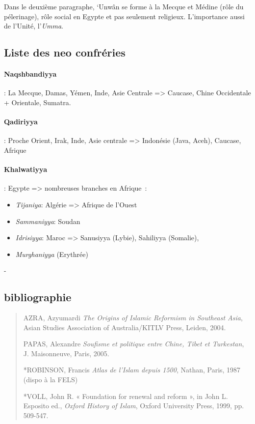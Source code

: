\begin{Prop}
 Dans le deuxième paragraphe, `Unwân se forme à la Mecque et Médine (rôle du pélerinage), rôle social en Egypte et pas seulement religieux. L'importance aussi de l'Unité, l'\textit{Umma}. 
\end{Prop}
 
\subsection{Liste des neo confréries}

\paragraph{Naqshbandiyya}: La Mecque, Damas, Yémen, Inde, Asie Centrale \label{Def:Naqshbandiyya}
                     => Caucase, Chine Occidentale + Orientale, Sumatra.

\paragraph{Qadiriyya}: Proche Orient, Irak, Inde, Asie centrale 
                    => Indonésie (Java, Aceh), Caucase, Afrique

\paragraph{Khalwatiyya}: Egypte => nombreuses branches en Afrique :

\begin{itemize}
    \item \textit{Tijaniya}: Algérie => Afrique de l’Ouest
    \item \textit{Sammaniyya}: Soudan
    \item \textit{Idrisiyya}: Maroc => Sanusiyya (Lybie), Sahiliyya (Somalie),
    \item \textit{Murghaniyya} (Erythrée)
\end{itemize}- 
 
\subsection{bibliographie}

\begin{quote}


AZRA, Azyumardi \emph{The Origins of Islamic Reformism in Southeast
Asia}, Asian Studies Association of Australia/KITLV Press, Leiden, 2004.

PAPAS, Alexandre \emph{Soufisme et politique entre Chine, Tibet et
Turkestan}, J. Maisonneuve, Paris, 2005.

*ROBINSON, Francis \emph{Atlas de l'Islam depuis 1500}, Nathan, Paris,
1987 (dispo à la FELS)

*VOLL, John R. « Foundation for renewal and reform », in John L.
Esposito ed., \emph{Oxford History of Islam}, Oxford University Press,
1999, pp. 509-547.
\end{quote}